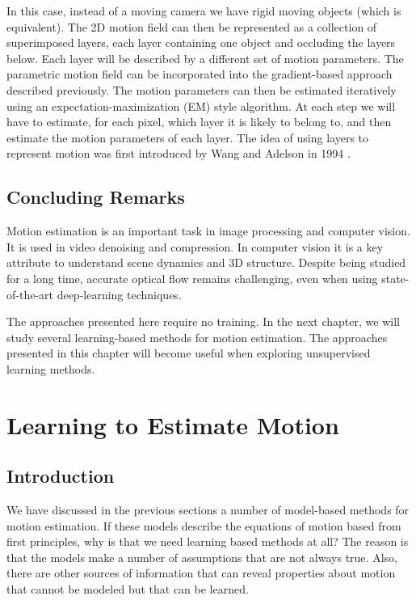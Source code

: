 In this case, instead of a moving camera we have rigid moving objects (which is equivalent). The 2D motion field can then be represented as a collection of superimposed layers, each layer containing one object and occluding the layers below. Each layer will be described by a different set of motion parameters. The parametric motion field can be incorporated into the gradient-based approach described previously. The motion parameters can then be estimated iteratively using an expectation-maximization (EM) style algorithm. At each step we will have to estimate, for each pixel, which layer it is likely to belong to, and then estimate the motion parameters of each layer. The idea of using layers to represent motion was first introduced by Wang and Adelson in 1994 \cite{Wang1994}.

\section{Concluding Remarks}

Motion estimation is an important task in image processing and computer vision. It is used in video denoising and compression. In computer vision it is a key attribute to understand scene dynamics and 3D structure. Despite being studied for a long time, accurate optical flow remains challenging, even when using state-of-the-art deep-learning techniques.

The approaches presented here require no training. In the next chapter, we will study several learning-based methods for motion estimation. The approaches presented in this chapter will become useful when exploring unsupervised learning methods.


\chapter{Learning to Estimate Motion}
\label{chap:learning_to_estimate_motion}

\section{Introduction}

We have discussed in the previous sections a number of model-based methods for motion estimation. If these models describe the equations of motion based from first principles, why is that we need learning based methods at all? The reason is that the models make a number of assumptions that are not always true.  Also, there are other sources of information that can reveal properties about motion that cannot be modeled but that can be learned.

